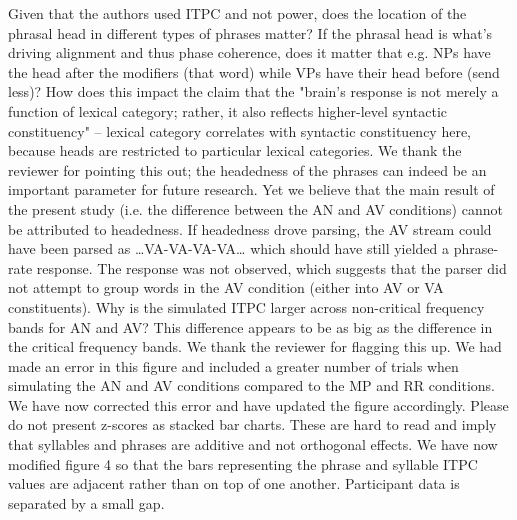 \documentclass[10pt,letterpaper]{article}
\begin{document}
\newline
\noindent
\color{black}
Given that the authors used ITPC and not power, does the location of the phrasal head in different types of phrases matter? If the phrasal head is what's driving alignment and thus phase coherence, does it matter that e.g. NPs have the head after the modifiers (that word) while VPs have their head before (send less)? How does this impact the claim that the "brain's response is not merely a function of lexical category; rather, it also reflects higher-level syntactic constituency" -- lexical category correlates with syntactic constituency here, because heads are restricted to particular lexical categories.
\color{blue}
We thank the reviewer for pointing this out; the headedness of the phrases can indeed be an important parameter for future research. Yet we believe that the main result of the present study (i.e. the difference between the AN and AV conditions) cannot be attributed to headedness. If headedness drove parsing, the AV stream could have been parsed as …VA-VA-VA-VA… which should have still yielded a phrase-rate response. The response was not observed, which suggests that the parser did not attempt to group words in the AV condition (either into AV or VA constituents). 
\newline
\noindent
\color{black}
Why is the simulated ITPC larger across non-critical frequency bands for AN and AV? This difference appears to be as big as the difference in the critical frequency bands.
\color{blue}
We thank the reviewer for flagging this up. We had made an error in this figure and included a greater number of trials when simulating the AN and AV conditions compared to the MP and RR conditions. We have now corrected this error and have updated the figure accordingly.
\color{black}
\newline
\noindent
Please do not present z-scores as stacked bar charts. These are hard to read and imply that syllables and phrases are additive and not orthogonal effects.
\color{blue}
We have now modified figure 4 so that the bars representing the phrase and syllable ITPC values are adjacent rather than on top of one another. Participant data is separated by a small gap.
\end{document}
